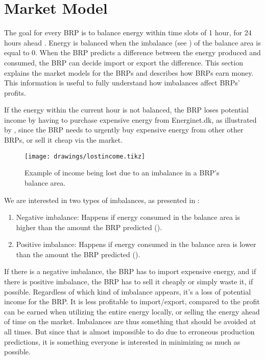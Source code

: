 \section{Market Model}\label{sec:marketmodel}
The goal for every BRP is to balance energy within time slots of 1 hour, for 24 hours ahead \cite[p~9]{NORDIC08}. Energy is balanced when the imbalance (see ) of the balance area is equal to 0. When the BRP predicts a difference between the energy produced and consumed, the BRP can decide import or export the difference. This section explains the market models for the BRPs and describes how BRPs earn money. This information is useful to fully understand how imbalances affect BRPs' profits. 

If the energy within the current hour is not balanced, the BRP loses potential income by having to purchase expensive energy from Energinet.dk, as illustrated by , since the BRP needs to urgently buy expensive energy from other other BRPs, or sell it cheap via the market. 

\begin{figure}[!htb]
\centering
\texttt{[image: drawings/lostincome.tikz]}
\caption{Example of income being lost due to an imbalance in a BRP's balance area.}\label{fig:income}
\end{figure}

We are interested in two types of imbalances, as presented in :

\begin{enumerate}
  \item Negative imbalance: Happens if energy consumed in the balance area is higher than the amount the BRP predicted ().
  \item Positive imbalance: Happens if energy consumed in the balance area is lower than the amount the BRP predicted ().
\end{enumerate}

If there is a negative imbalance, the BRP has to import expensive energy, and if there is positive imbalance, the BRP has to sell it cheaply or simply waste it, if possible. Regardless of which kind of imbalance appears, it's a loss of potential income for the BRP. It is less profitable to import/export, compared to the profit can be earned when utilizing the entire energy locally, or selling the energy ahead of time on the market. Imbalances are thus something that should be avoided at all times. But since that is almost impossible to do due to erroneous production predictions, it is something everyone is interested in minimizing as much as possible. 

